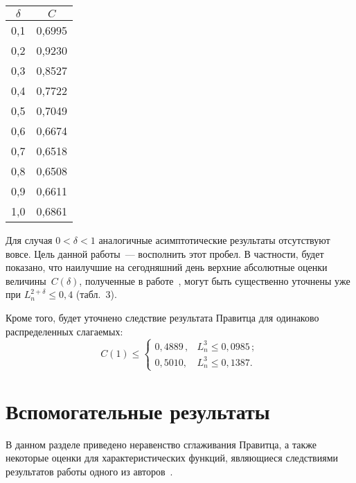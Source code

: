 \begin{multicols}{2}
{\small
\begin{center}
\tabcolsep=15.5pt
\begin{tabular}{|c|c|}
\hline
$\delta$& $C$\\
\hline
0,1&0,6995\\
0,2&0,9230\\
0,3&0,8527\\
0,4&0,7722\\
0,5&0,7049\\
0,6&0,6674\\
0,7&0,6518\\
0,8&0,6508\\
0,9&0,6611\\
1,0&0,6861\\
 \hline
\end{tabular}
\end{center}
}
\vspace*{6pt}


\bigskip
\addtocounter{table}{1}

Для случая ${0<\delta<1}$ аналогичные асимптотические результаты
отсутствуют вовсе. Цель данной работы~--- восполнить этот пробел. В
частности, будет показано, что наилучшие на сегодняшний день верхние
абсолютные оценки величины~$C(\delta)$, полученные в
работе~\cite{GaponovaKorchaginShevtsova2009}, могут быть существенно
уточнены уже при $L_n^{2+\delta}\le0{,}4$ (табл.~3).


Кроме того, будет уточнено следствие результата Правитца для одинаково
распределенных слагаемых:
$$
C(1)\le
\begin{cases}
0{,}4889\,,&L_n^3\le0{,}0985\,;\\
0{,}5010,&L_n^3\le0{,}1387.
\end{cases}
$$

\section{Вспомогательные результаты}

В данном разделе приведено неравенство сглаживания Правитца, а также
некоторые оценки для характеристических функций, являющиеся
следствиями результатов работы одного из авторов~\cite{Shevtsova2009}.


\end{multicols}
